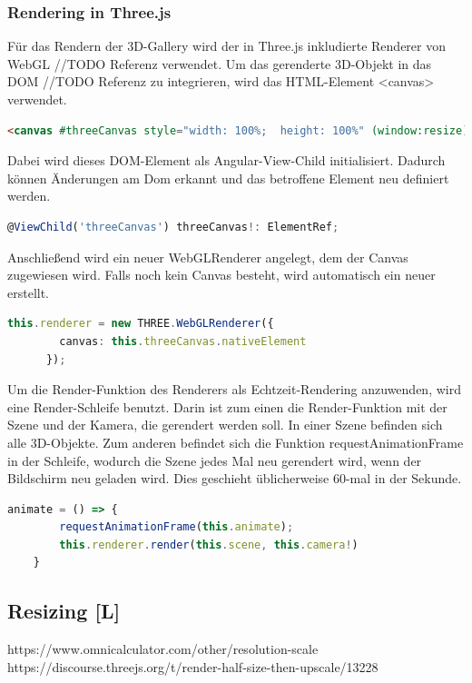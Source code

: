 \subsubsection{Rendering in Three.js}
Für das Rendern der 3D-Gallery wird der in Three.js inkludierte Renderer von WebGL //TODO Referenz verwendet. Um das gerenderte 3D-Objekt in das DOM //TODO Referenz zu integrieren, wird das HTML-Element <canvas> verwendet. \cite{ThreejsWebGLRenderer}

\begin{lstlisting}[caption={Canvas-Element in HTML},language=HTML,label=lst:impl:canvas]
    <canvas #threeCanvas style="width: 100%;  height: 100%" (window:resize)="onResize($event)"></canvas>
\end{lstlisting}
Dabei wird dieses DOM-Element als Angular-View-Child initialisiert. Dadurch können Änderungen am Dom erkannt und das betroffene Element neu definiert werden. \cite{AngularViewChild}
\begin{lstlisting}[caption={Canvas als View-Child initialisieren},language=TypeScript,label=lst:impl:viewchild]
    @ViewChild('threeCanvas') threeCanvas!: ElementRef;
\end{lstlisting}
Anschließend wird ein neuer WebGLRenderer angelegt, dem der Canvas zugewiesen wird. Falls noch kein Canvas besteht, wird automatisch ein neuer erstellt. \cite{ThreejsWebGLRenderer}
\begin{lstlisting}[caption={WebGlRenderer anlegen},language=TypeScript,label=lst:impl:WebGlRenderer]
    this.renderer = new THREE.WebGLRenderer({
        canvas: this.threeCanvas.nativeElement
      });
\end{lstlisting}
Um die Render-Funktion des Renderers als Echtzeit-Rendering anzuwenden, wird eine Render-Schleife benutzt. Darin ist zum einen die Render-Funktion mit der Szene und der Kamera, die gerendert werden soll. In einer Szene befinden sich alle 3D-Objekte. Zum anderen befindet sich die Funktion requestAnimationFrame in der Schleife, wodurch die Szene jedes Mal neu gerendert wird, wenn der Bildschirm neu geladen wird. Dies geschieht üblicherweise 60-mal in der Sekunde. \cite{ThreejsCreateAScene}
\begin{lstlisting}[caption={Animations-Schleife},language=TypeScript,label=lst:impl:animationloop]
    animate = () => {
        requestAnimationFrame(this.animate);
        this.renderer.render(this.scene, this.camera!)
    }  
\end{lstlisting}
\subsection{Resizing [L]} 
https://www.omnicalculator.com/other/resolution-scale
https://discourse.threejs.org/t/render-half-size-then-upscale/13228

